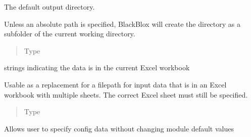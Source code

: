 \documentclass[a4paper,10pt,english]{sphinxmanual}
\begin{document}

\begin{fulllineitems}
\label{\detokenize{dataconfig:dataconfig.outdir}}
The default output directory.

Unless an absolute path is specified, BlackBlox will create the directory
as a subfolder of the current working directory.
\begin{quote}\begin{description}
\item[{Type}] \leavevmode
{}

\end{description}\end{quote}

\end{fulllineitems}


\begin{fulllineitems}
\label{\detokenize{dataconfig:dataconfig.same_xls}}
strings indicating the data is in the current Excel workbook

Usable as a replacement for a filepath for input data that is in an
Excel workbook with multiple sheets. The correct Excel sheet must still
be specified.
\begin{quote}\begin{description}
\item[{Type}] \leavevmode
{}

\end{description}\end{quote}

\end{fulllineitems}


\begin{fulllineitems}
\label{\detokenize{dataconfig:dataconfig.set_config}}
Allows user to specify config data without changing module default values

\end{fulllineitems}
\end{document}
